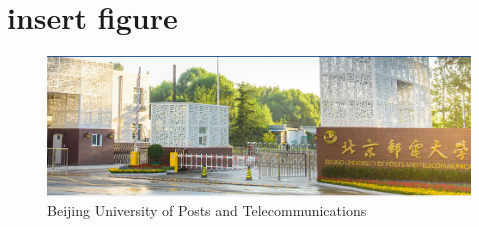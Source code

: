 \documentclass[]{article}
\begin{document}
\section{insert figure}
\begin{figure}[ht]
	\caption{Beijing University of Posts and Telecommunications}
	\includegraphics[width=13cm]{bupt.png}
\end{figure}
\end{document}
